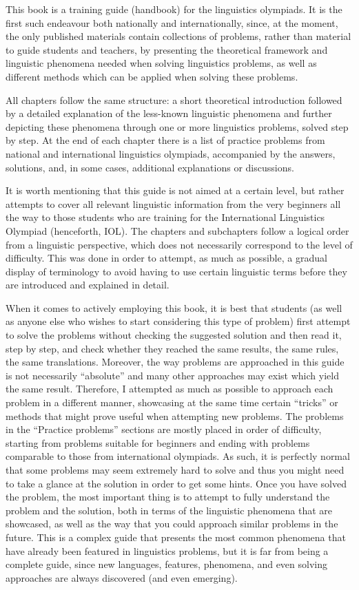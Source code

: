 \addchap{\lsPrefaceTitle}

This book is a training guide (handbook) for the linguistics olympiads. It is the first such endeavour both nationally and internationally, since, at the moment, the only published materials contain collections of problems, rather than material to guide students and teachers, by presenting the theoretical framework and linguistic phenomena needed when solving linguistics problems, as well as different methods which can be applied when solving these problems. 
 
All chapters follow the same structure: a short theoretical introduction followed by a detailed explanation of the less-known linguistic phenomena and further depicting these phenomena through one or more linguistics problems, solved step by step. At the end of each chapter there is a list of practice problems from national and international linguistics olympiads, accompanied by the answers, solutions, and, in some cases, additional explanations or discussions. 

It is worth mentioning that this guide is not aimed at a certain level, but rather attempts to cover all relevant linguistic information from the very beginners all the way to those students who are training for the International Linguistics Olympiad (henceforth, IOL). The chapters and subchapters follow a logical order from a linguistic perspective, which does not necessarily correspond to the level of difficulty. This was done in order to attempt, as much as possible, a gradual display of terminology to avoid having to use certain linguistic terms before they are introduced and explained in detail.  

When it comes to actively employing this book, it is best that students (as well as anyone else who wishes to start considering this type of problem) first attempt to solve the problems without checking the suggested solution and then read it, step by step, and check whether they reached the same results, the same rules, the same translations. Moreover, the way problems are approached in this guide is not necessarily “absolute” and many other approaches may exist which yield the same result. Therefore, I attempted as much as possible to approach each problem in a different manner, showcasing at the same time certain “tricks” or methods that might prove useful when attempting new problems. The problems in the “Practice problems” sections are mostly placed in order of difficulty, starting from problems suitable for beginners and ending with problems comparable to those from international olympiads. As such, it is perfectly normal that some problems may seem extremely hard to solve and thus you might need to take a glance at the solution in order to get some hints. Once you have solved the problem, the most important thing is to attempt to fully understand the problem and the solution, both in terms of the linguistic phenomena that are showcased, as well as the way that you could approach similar problems in the future. This is a complex guide that presents the most common phenomena that have already been featured in linguistics problems, but it is far from being a complete guide, since new languages, features, phenomena, and even solving approaches are always discovered (and even emerging).

